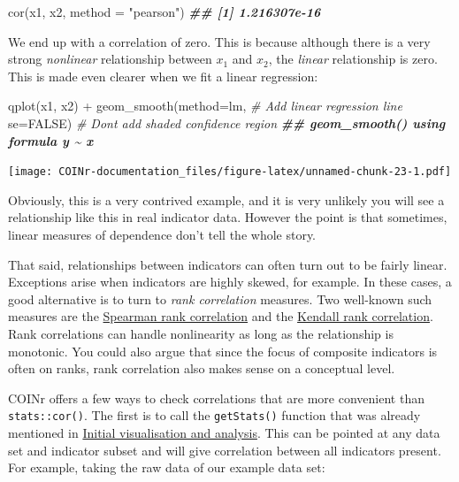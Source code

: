 \documentclass[
]{book}
\newenvironment{Shaded}{\begin{snugshade}}{\end{snugshade}}
\newcommand{\AttributeTok}[1]{\textcolor[rgb]{0.77,0.63,0.00}{#1}}
\newcommand{\CommentTok}[1]{\textcolor[rgb]{0.56,0.35,0.01}{\textit{#1}}}
\newcommand{\ConstantTok}[1]{\textcolor[rgb]{0.00,0.00,0.00}{#1}}
\newcommand{\DocumentationTok}[1]{\textcolor[rgb]{0.56,0.35,0.01}{\textbf{\textit{#1}}}}
\newcommand{\FunctionTok}[1]{\textcolor[rgb]{0.00,0.00,0.00}{#1}}
\newcommand{\NormalTok}[1]{#1}
\newcommand{\SpecialCharTok}[1]{\textcolor[rgb]{0.00,0.00,0.00}{#1}}
\newcommand{\StringTok}[1]{\textcolor[rgb]{0.31,0.60,0.02}{#1}}
\begin{document}
\begin{Shaded}
\begin{Highlighting}[]
\FunctionTok{cor}\NormalTok{(x1, x2, }\AttributeTok{method =} \StringTok{"pearson"}\NormalTok{)}
\DocumentationTok{\#\# [1] 1.216307e{-}16}
\end{Highlighting}
\end{Shaded}

We end up with a correlation of zero. This is because although there is a very strong \emph{nonlinear} relationship between \(x_1\) and \(x_2\), the \emph{linear} relationship is zero. This is made even clearer when we fit a linear regression:

\begin{Shaded}
\begin{Highlighting}[]
\FunctionTok{qplot}\NormalTok{(x1, x2) }\SpecialCharTok{+}
    \FunctionTok{geom\_smooth}\NormalTok{(}\AttributeTok{method=}\NormalTok{lm,   }\CommentTok{\# Add linear regression line}
                \AttributeTok{se=}\ConstantTok{FALSE}\NormalTok{)    }\CommentTok{\# Don\textquotesingle{}t add shaded confidence region}
\DocumentationTok{\#\# \textasciigrave{}geom\_smooth()\textasciigrave{} using formula \textquotesingle{}y \textasciitilde{} x\textquotesingle{}}
\end{Highlighting}
\end{Shaded}

\texttt{[image: COINr-documentation\_files/figure-latex/unnamed-chunk-23-1.pdf]}

Obviously, this is a very contrived example, and it is very unlikely you will see a relationship like this in real indicator data. However the point is that sometimes, linear measures of dependence don't tell the whole story.

That said, relationships between indicators can often turn out to be fairly linear. Exceptions arise when indicators are highly skewed, for example. In these cases, a good alternative is to turn to \emph{rank correlation} measures. Two well-known such measures are the \href{https://en.wikipedia.org/wiki/Spearman\%27s_rank_correlation_coefficient}{Spearman rank correlation} and the \href{https://en.wikipedia.org/wiki/Kendall_rank_correlation_coefficient}{Kendall rank correlation}. Rank correlations can handle nonlinearity as long as the relationship is monotonic. You could also argue that since the focus of composite indicators is often on ranks, rank correlation also makes sense on a conceptual level.

COINr offers a few ways to check correlations that are more convenient than \texttt{stats::cor()}. The first is to call the \texttt{getStats()} function that was already mentioned in \protect\hyperlink{initial-visualisation-and-analysis}{Initial visualisation and analysis}. This can be pointed at any data set and indicator subset and will give correlation between all indicators present. For example, taking the raw data of our example data set:
\end{document}
